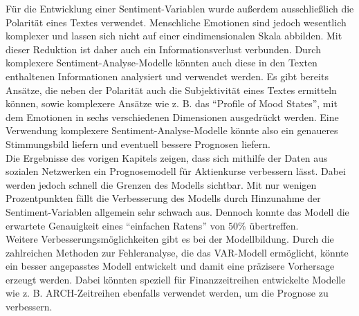 \documentclass[
	a4paper,
	12pt,
	bibliography=totocnumbered,
	twoside,
]{scrreprt}
\begin{document}
Für die Entwicklung einer Sentiment-Variablen wurde außerdem ausschließlich die Polarität eines Textes verwendet. Menschliche Emotionen sind jedoch wesentlich komplexer und lassen sich nicht auf einer eindimensionalen Skala abbilden. Mit dieser Reduktion ist daher auch ein Informationsverlust verbunden. Durch komplexere Sentiment-Analyse-Modelle könnten auch diese in den Texten enthaltenen Informationen analysiert und verwendet werden. Es gibt bereits Ansätze, die neben der Polarität auch die Subjektivität eines Textes ermitteln können, sowie komplexere Ansätze wie z. B. das "`Profile of Mood States"', mit dem Emotionen in sechs verschiedenen Dimensionen ausgedrückt werden. Eine Verwendung komplexere Sentiment-Analyse-Modelle könnte also ein genaueres Stimmungsbild liefern und eventuell bessere Prognosen liefern.\\

Die Ergebnisse des vorigen Kapitels zeigen, dass sich mithilfe der Daten aus sozialen Netzwerken ein Prognosemodell für Aktienkurse verbessern lässt. Dabei werden jedoch schnell die Grenzen des Modells sichtbar.
Mit nur wenigen Prozentpunkten fällt die Verbesserung des Modells durch Hinzunahme der Sentiment-Variablen allgemein sehr schwach aus.
Dennoch konnte das Modell die erwartete Genauigkeit eines "`einfachen Ratens"' von $50\%$ übertreffen.\\

Weitere Verbesserungsmöglichkeiten gibt es bei der Modellbildung.
Durch die zahlreichen Methoden zur Fehleranalyse, die das VAR-Modell ermöglicht, könnte ein besser angepasstes Modell entwickelt und damit eine präzisere Vorhersage erzeugt werden.
Dabei könnten speziell für Finanzzeitreihen entwickelte Modelle wie z. B. ARCH-Zeitreihen ebenfalls verwendet werden, um die Prognose zu verbessern. \\


\newpage
\end{document}
